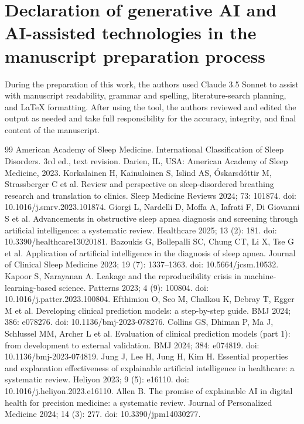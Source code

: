 \documentclass[a4paper,fleqn]{cas-dc}
\begin{document}
\section*{Declaration of generative AI and AI-assisted technologies in the manuscript preparation process}
During the preparation of this work, the authors used Claude 3.5 Sonnet to assist with manuscript readability, grammar and spelling, literature-search planning, and LaTeX formatting. After using the tool, the authors reviewed and edited the output as needed and take full responsibility for the accuracy, integrity, and final content of the manuscript.


\begin{thebibliography}{99}
 American Academy of Sleep Medicine. International Classification of Sleep Disorders. 3rd ed., text revision. Darien, IL, USA: American Academy of Sleep Medicine, 2023.
 Korkalainen H, Kainulainen S, Islind AS, {\'{O}}skarsd{\'{o}}ttir M, Strassberger C et al. Review and perspective on sleep-disordered breathing research and translation to clinics. Sleep Medicine Reviews 2024; 73: 101874. doi: 10.1016/j.smrv.2023.101874.
 Giorgi L, Nardelli D, Moffa A, Iafrati F, Di Giovanni S et al. Advancements in obstructive sleep apnea diagnosis and screening through artificial intelligence: a systematic review. Healthcare 2025; 13 (2): 181. doi: 10.3390/healthcare13020181.
 Bazoukis G, Bollepalli SC, Chung CT, Li X, Tse G et al. Application of artificial intelligence in the diagnosis of sleep apnea. Journal of Clinical Sleep Medicine 2023; 19 (7): 1337--1363. doi: 10.5664/jcsm.10532.
 Kapoor S, Narayanan A. Leakage and the reproducibility crisis in machine-learning-based science. Patterns 2023; 4 (9): 100804. doi: 10.1016/j.patter.2023.100804.
 Efthimiou O, Seo M, Chalkou K, Debray T, Egger M et al. Developing clinical prediction models: a step-by-step guide. BMJ 2024; 386: e078276. doi: 10.1136/bmj-2023-078276.
 Collins GS, Dhiman P, Ma J, Schlussel MM, Archer L et al. Evaluation of clinical prediction models (part 1): from development to external validation. BMJ 2024; 384: e074819. doi: 10.1136/bmj-2023-074819.
 Jung J, Lee H, Jung H, Kim H. Essential properties and explanation effectiveness of explainable artificial intelligence in healthcare: a systematic review. Heliyon 2023; 9 (5): e16110. doi: 10.1016/j.heliyon.2023.e16110.
 Allen B. The promise of explainable AI in digital health for precision medicine: a systematic review. Journal of Personalized Medicine 2024; 14 (3): 277. doi: 10.3390/jpm14030277.

\end{thebibliography}
\end{document}

